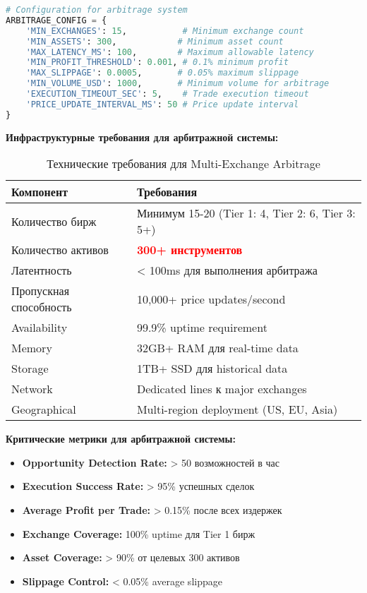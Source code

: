 \documentclass[12pt,a4paper]{article}
\begin{document}
\begin{lstlisting}[language=Python, caption=Arbitrage Monitoring System]
# Configuration for arbitrage system
ARBITRAGE_CONFIG = {
    'MIN_EXCHANGES': 15,           # Minimum exchange count
    'MIN_ASSETS': 300,            # Minimum asset count
    'MAX_LATENCY_MS': 100,        # Maximum allowable latency
    'MIN_PROFIT_THRESHOLD': 0.001, # 0.1% minimum profit
    'MAX_SLIPPAGE': 0.0005,       # 0.05% maximum slippage
    'MIN_VOLUME_USD': 1000,       # Minimum volume for arbitrage
    'EXECUTION_TIMEOUT_SEC': 5,    # Trade execution timeout
    'PRICE_UPDATE_INTERVAL_MS': 50 # Price update interval
}
\end{lstlisting}

\textbf{Инфраструктурные требования для арбитражной системы:}

\begin{table}[H]
\centering
\caption{Технические требования для Multi-Exchange Arbitrage}
\begin{tabular}{@{}ll@{}}
\toprule
\textbf{Компонент} & \textbf{Требования} \\ \midrule
Количество бирж & Минимум 15-20 (Tier 1: 4, Tier 2: 6, Tier 3: 5+) \\
Количество активов & \textcolor{red}{\textbf{300+ инструментов}} \\
Латентность & < 100ms для выполнения арбитража \\
Пропускная способность & 10,000+ price updates/second \\
Availability & 99.9\% uptime requirement \\
Memory & 32GB+ RAM для real-time data \\
Storage & 1TB+ SSD для historical data \\
Network & Dedicated lines к major exchanges \\
Geographical & Multi-region deployment (US, EU, Asia) \\
\bottomrule
\end{tabular}
\end{table}

\textbf{Критические метрики для арбитражной системы:}
\begin{itemize}
    \item \textbf{Opportunity Detection Rate:} > 50 возможностей в час
    \item \textbf{Execution Success Rate:} > 95\% успешных сделок
    \item \textbf{Average Profit per Trade:} > 0.15\% после всех издержек
    \item \textbf{Exchange Coverage:} 100\% uptime для Tier 1 бирж
    \item \textbf{Asset Coverage:} > 90\% от целевых 300 активов
    \item \textbf{Slippage Control:} < 0.05\% average slippage
\end{itemize}
\end{document}

